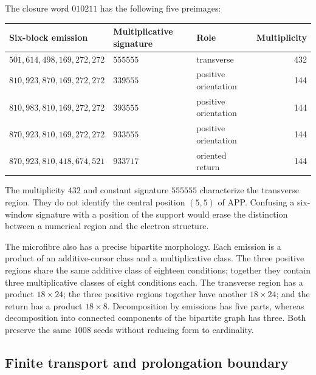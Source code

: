The closure word \(010211\) has the following five preimages:
\begin{center}\small
\begin{tabular}{@{}lll r@{}}\toprule
Six-block emission&Multiplicative signature&Role&Multiplicity\\\midrule
\(501,614,498,169,272,272\)&\(555555\)&transverse&432\\
\(810,923,870,169,272,272\)&\(339555\)&positive orientation&144\\
\(810,983,810,169,272,272\)&\(393555\)&positive orientation&144\\
\(870,923,810,169,272,272\)&\(933555\)&positive orientation&144\\
\(870,923,810,418,674,521\)&\(933717\)&oriented return&144\\\bottomrule
\end{tabular}
\end{center}
The multiplicity \(432\) and constant signature \(555555\) characterize the transverse region. They do not identify the central position \((5,5)\) of APP. Confusing a six-window signature with a position of the support would erase the distinction between a numerical region and the electron structure.

The microfibre also has a precise bipartite morphology. Each emission is a product of an additive-cursor class and a multiplicative class. The three positive regions share the same additive class of eighteen conditions; together they contain three multiplicative classes of eight conditions each. The transverse region has a product \(18\times24\); the three positive regions together have another \(18\times24\); and the return has a product \(18\times8\). Decomposition by emissions has five parts, whereas decomposition into connected components of the bipartite graph has three. Both preserve the same \(1008\) seeds without reducing form to cardinality.





\subsection{Finite transport and prolongation boundary}

